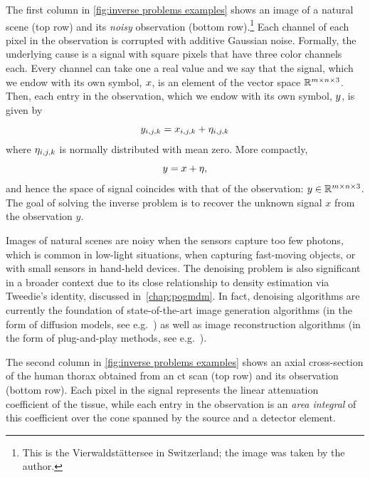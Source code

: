 The first column in \cref{fig:inverse problems examples} shows an image of a natural scene (top row) and its \emph{noisy} observation (bottom row).\footnote{%
	This is the Vierwaldstättersee in Switzerland; the image was taken by the author.
}
Each channel of each pixel in the observation is corrupted with additive Gaussian noise.
Formally, the underlying cause is a signal with square pixels that have three color channels each.
Every channel can take one a real value and we say that the signal, which we endow with its own symbol, \( x \), is an element of the vector space \( \mathbb{R}^{m \times n \times \num{3}} \).
Then, each entry in the observation, which we endow with its own symbol, \( y \), is given by
\begin{equation}
	y_{i, j, k} = x_{i, j, k} + \eta_{i, j, k}
\end{equation}
where \( \eta_{i, j, k} \) is normally distributed with mean zero.
More compactly,
\begin{equation}
	y = x + \eta,
\end{equation}
and hence the space of signal coincides with that of the observation: \( y \in \mathbb{R}^{m \times n \times \num{3}} \).
The goal of solving the inverse problem is to recover the unknown signal \( x \) from the observation \( y \).

Images of natural scenes are noisy when the sensors capture too few photons, which is common in low-light situations, when capturing fast-moving objects, or with small sensors in hand-held devices.
The denoising problem is also significant in a broader context due to its close relationship to density estimation via Tweedie's identity, discussed in~\cref{chap:pogmdm}.
In fact, denoising algorithms are currently the foundation of state-of-the-art image generation algorithms (in the form of diffusion models, see e.g.~\cite{Karras2022edm}) as well as image reconstruction algorithms (in the form of plug-and-play methods, see e.g.~\cite{Hurault2024}).

The second column in \cref{fig:inverse problems examples} shows an axial cross-section of the human thorax obtained from an \xray{} \gls{ct} scan (top row) and its observation (bottom row).
Each pixel in the signal represents the linear \xray{} attenuation coefficient of the tissue, while each entry in the observation is an \emph{area integral} of this coefficient over the cone spanned by the \xray{} source and a detector element.

